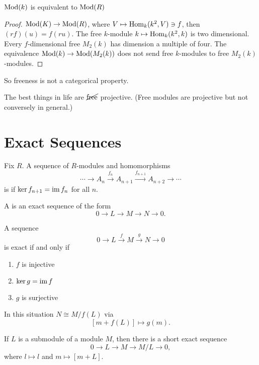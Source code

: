  \begin{prop}
    $\operatorname{Mod}(k)$ is equivalent to $\operatorname{Mod}(R)$
  \end{prop}
  \begin{proof}
    $\operatorname{Mod}(K) \to \operatorname{Mod}(R)$, where $V \mapsto \operatorname{Hom}_k(k^2,V) \ni f$, then
    $(rf)(u) = f(ru)$. The free $k$-module $k\mapsto \operatorname{Hom}_k(k^2,k)$ is two
    dimensional. Every $f$-dimensional free $M_2(k)$ has dimension a multiple
    of four. The equivalence $\operatorname{Mod}(k)\to \operatorname{Mod}(M_2(k))$ does not send free
    $k$-modules to free $M_2(k)$-modules.
  \end{proof}

  So freeness is not a categorical property.

  The best things in life are $\cancel{\text{free}}$ projective. (Free modules
  are projective but not conversely in general.)

\section{Exact Sequences}

  \begin{define}
    Fix $R$. A sequence of $R$-modules and homomorphisms
    \[ \cdots \to A_n \stackrel{f_n}{\to} A_{n+1} \stackrel{f_{n+1}}{\to} A_{n+2} \to \cdots \]
    is  if $\ker{f_{n+1}} = \operatorname{im}{f_n}$ for all $n$.
  \end{define}
  \begin{define}
    A  is an exact sequence of the form
    \[ 0 \to L \to M \to N \to 0. \]
  \end{define}

  \begin{lemma}
    A sequence
    \[ 0 \to L \stackrel{f}{\to} M \stackrel{g}{\to} N \to 0 \]
    is exact if and only if
    \begin{enumerate}
      \item $f$ is injective
      \item $\ker{g} = \operatorname{im}{f}$
      \item $g$ is surjective
    \end{enumerate}
  \end{lemma}

  In this situation $N \cong M/f(L)$ via
  \[ [m+f(L)] \mapsto g(m). \]

  If $L$ is a submodule of a module $M$, then there is a short exact sequence
  \[ 0 \to L \to M \to M/L \to 0, \]
  where $l\mapsto l$ and $m\mapsto [m+L]$.

